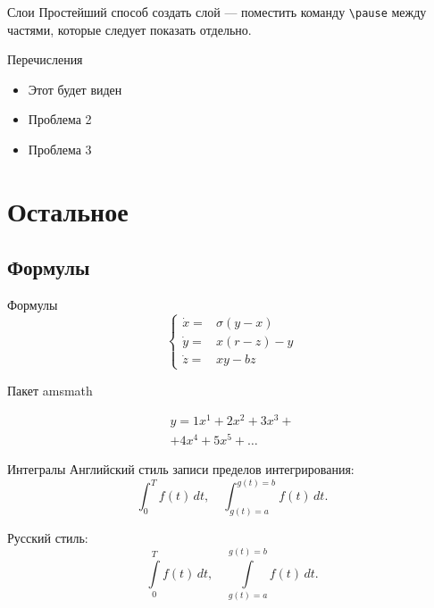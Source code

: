 \begin{frame}{Слои}
  Простейший способ создать слой
  \pause
  --- поместить команду \alert{\texttt{\textbackslash pause}} между частями,
  \pause
  которые следует показать отдельно.
\end{frame}

\begin{frame}{Перечисления}
  \begin{itemize}
    \item<1-> Этот будет виден
    \item<2> Проблема 2
    \item<3> Проблема 3
  \end{itemize}
\end{frame}


\section{Остальное}

\subsection{Формулы}

\begin{frame}{Формулы}
  \[
  \left\{
  \begin{array}{rl}
    \dot x = & \sigma (y-x)  \\
    \dot y = & x (r - z) - y \\
    \dot z = & xy - bz
  \end{array}
  \right.
  \]
\end{frame}

\begin{frame}{Пакет amsmath}
  \centering
  \begin{minipage}[t]{0.5\linewidth}
    \begin{multline*}
      y = 1 x^1 + 2 x^2 + 3 x^3 + \\ + 4 x^4 + 5 x^5 + \dots
    \end{multline*}
  \end{minipage}
\end{frame}

\begin{frame}{Интегралы}
  Английский стиль записи пределов интегрирования:
  \[
    \int_{0}^{T} f(t)\,dt,\quad
    \int_{g(t)=a}^{g(t)=b} f(t)\,dt.
  \]
  
  Русский стиль:
  \[
    \int\limits_{0}^{T} f(t)\,dt,\quad
    \int\limits_{g(t)=a}^{g(t)=b} f(t)\,dt.
  \]
\end{frame}

